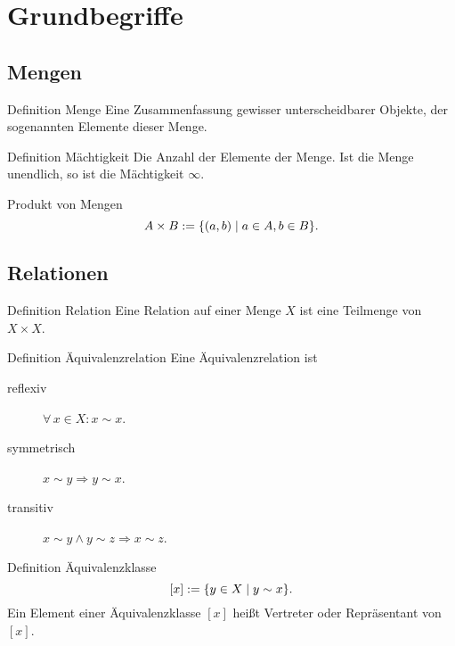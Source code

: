 \documentclass[a6paper,11pt,print,grid=front]{kartei}
\begin{document}
\section*{Grundbegriffe}
\subsection*{Mengen}
\begin{karte}{Definition Menge}
    Eine Zusammenfassung gewisser unterscheidbarer Objekte, 
    der sogenannten Elemente dieser Menge.
\end{karte}
\begin{karte}{Definition Mächtigkeit}
    Die Anzahl der Elemente der Menge. Ist die Menge unendlich, 
    so ist die Mächtigkeit \( \infty \).
\end{karte}
\begin{karte}{Produkt von Mengen}
    \[ A \times B := \{ (a,b) \;\vert \; 
    a \in A, b \in B \}. \]
\end{karte}
\subsection*{Relationen}
\begin{karte}{Definition Relation}
    Eine Relation auf einer Menge \(X\)  ist eine Teilmenge 
    von \( X \times X \).
\end{karte}
\begin{karte}{Definition Äquivalenzrelation}
    Eine Äquivalenzrelation ist 
    \begin{description}
        \item[reflexiv] \( \forall \, x \in X : x \sim x \).
        \item[symmetrisch] \( x \sim y \Rightarrow y \sim x \).
        \item[transitiv] \( x \sim y \wedge y \sim z \Rightarrow 
        x \sim z \).
    \end{description}
\end{karte}
\begin{karte}{Definition Äquivalenzklasse}
    \[ [ x ] := \{ y \in X \;\vert \; y \sim x \}. \]
    Ein Element einer Äquivalenzklasse \( [x] \) heißt 
    Vertreter oder Repräsentant von \( [x] \).
\end{karte}
\end{document}

